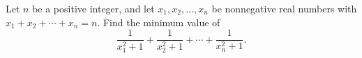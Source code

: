 Let $n$ be a positive integer, and let $x_1,x_2,\dots,x_n$ be nonnegative real numbers with $x_1+x_2+\cdots+x_n=n$. Find the minimum value of
\[\dfrac{1}{x_1^2+1}+\dfrac{1}{x_2^2+1}+\cdots+\dfrac{1}{x_n^2+1}.\]
